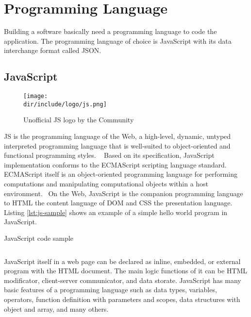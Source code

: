 \section{Programming Language}
\label{sec:programming}

Building a software basically need a programming language to code the application.
The programming language of choice is JavaScript with its data interchange format called JSON.

\subsection{JavaScript}

\begin{wrapfigure}{r}{0.5\textwidth}
  \vspace{-20pt}
  \begin{center}
    \texttt{[image: \\dir/include/logo/js.png]}
  \end{center}
  \vspace{-20pt}
  \caption[Unofficial JS logo]{Unofficial JS logo by the Community}
  \label{fig:js-logo}
  \vspace{-10pt}
\end{wrapfigure}

\ac{JS} is the programming language of the Web, a high-level, dynamic, untyped interpreted programming language that is well-suited to object-oriented and functional programming styles.
~\autocite{Flanagan:2011:JS}
Based on its specification, JavaScript implementation conforms to the ECMAScript\textsuperscript{\textregistered} scripting language standard.
ECMAScript itself is an object-oriented programming language for performing computations and manipulating computational objects within a host environment.~\autocite{ECMA:2011:ECMAScript}
On the Web, JavaScript is the companion programming language to \ac{HTML} the content language of \ac{DOM} and \ac{CSS} the presentation language.
Listing \autoref{lst:js-sample} shows an example of a simple hello world program in JavaScript.

\begin{listing}[htbp]
\caption{JavaScript code sample}
\inputminted{javascript}{\dir/include/js-sample.js}
\label{lst:js-sample}
\end{listing}

JavaScript itself in a web page can be declared as inline, embedded, or external program with the \ac{HTML} document.
The main logic functions of it can be \ac{HTML} modificator, client-server communicator, and data storate.
JavaScript has many basic features of a programming language such as data types, variables, operators, function definition with parameters and scopes, data structures with object and array, and many others.

